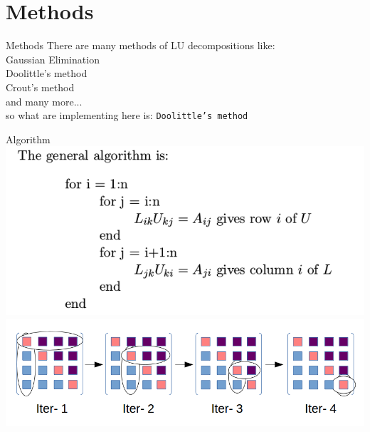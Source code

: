 \documentclass{beamer}
\begin{document}
\section{Methods}
\begin{frame}{Methods}
There are many methods of LU decompositions like:\\
\hspace*{2cm} Gaussian Elimination\\
\hspace*{2cm} Doolittle's method\\
\hspace*{2cm} Crout's method\\
\hspace*{2cm} and many more...\\
so what are implementing here is: \texttt{Doolittle's method}
\end{frame}
\begin{frame}{Algorithm}
\includegraphics[scale=.3]{pic.png}\\
\includegraphics[scale=.35]{pic1.png}
\end{frame}
\end{document}
